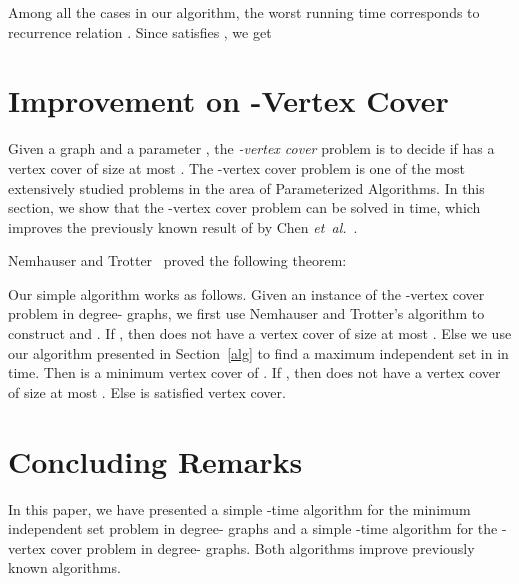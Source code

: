 \documentclass[runningheads]{llncs}
\begin{document}
Among all the cases in our algorithm, the worst running time
corresponds to recurrence relation . Since
 satisfies , we get



\section{Improvement on -Vertex Cover}
Given a graph  and a parameter , the \emph{-vertex cover}
problem is to decide if  has a vertex cover of size at most
. The -vertex cover problem is one of the most extensively
studied problems in the area of Parameterized Algorithms. In this
section, we show that the -vertex cover problem can be solved
in  time, which improves
 the previously known result of  by Chen \emph{et~al.}~\cite{Chen:labeled3vc}.

Nemhauser and Trotter~\cite{Nemhauser:VCkernel} proved the
following theorem:


Our simple algorithm works as follows. Given an instance 
of the -vertex cover problem in degree- graphs, we first use
Nemhauser and Trotter's algorithm to construct  and . If
, then  does not have a vertex cover of size at most
. Else we use our algorithm presented in Section~\ref{alg} to
find a maximum independent set  in  in
 time. Then  is a
minimum vertex cover of . If , then  does not
have a vertex cover of size at most . Else  is
satisfied vertex cover.










\section{Concluding Remarks}\label{conclusion}
In this paper, we have presented a simple -time
algorithm for the minimum independent set problem in degree-
graphs and a simple -time algorithm for the
-vertex cover problem in degree- graphs. Both algorithms
improve previously known algorithms.
\end{document}
